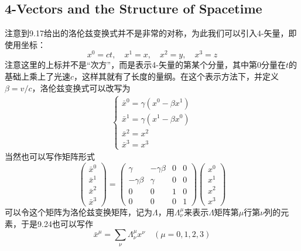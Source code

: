 \documentclass[14pt,oneside]{book}
\begin{document}
\begin{large}
\subsection{4-Vectors and the Structure of Spacetime}
注意到9.17给出的洛伦兹变换式并不是非常的对称，为此我们可以引入4-矢量，即使用坐标：
\begin{equation}
  x^0=ct,\quad x^1=x,\quad x^2=y,\quad x^3=z
\end{equation}
注意这里的上标并不是“次方”，而是表示4-矢量的第某个分量，其中第0分量在$t$的基础上乘上了光速$c$，这样其就有了长度的量纲。在这个表示方法下，并定义$\beta=v/c$，洛伦兹变换式可以改写为
\begin{align}
	\begin{cases}
		\bar x^0=\gamma(x^0-\beta x^1)\\
		\bar x^1=\gamma(x^1-\beta x^0)\\
		\bar x^2=x^2\\
		\bar x^3=x^3
	\end{cases}
\end{align}
当然也可以写作矩阵形式
\begin{equation}
\left(\begin{array}{c}
\bar{x}^0 \\
\bar{x}^1 \\
\bar{x}^2 \\
\bar{x}^3
\end{array}\right)=\left(\begin{array}{cccc}
\gamma & -\gamma \beta & 0 & 0 \\
-\gamma \beta & \gamma & 0 & 0 \\
0 & 0 & 1 & 0 \\
0 & 0 & 0 & 1
\end{array}\right)\left(\begin{array}{l}
x^0 \\
x^1 \\
x^2 \\
x^3
\end{array}\right)
\end{equation}
可以令这个矩阵为洛伦兹变换矩阵，记为$\Lambda$，用$\Lambda_\nu^\mu$来表示$\Lambda$矩阵第$\mu$行第$\nu$列的元素，于是9.24也可以写作
\begin{equation}
  \bar x^\mu=\sum_{\nu}\Lambda^\mu_{\nu}x^\nu\quad(\mu=0,1,2,3)
\end{equation}


\end{large}
\end{document}
